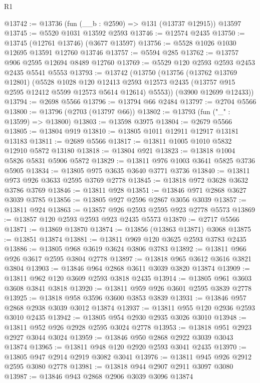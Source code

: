 \begin{lexlean}{R1}
\begin{coremodule}
@13742 := @13736 (fun (__b : @2590) => @131 (@13737 @12915)) @13597
@13745 := @5520 @1031 @13592 @2593
@13746 := @12574 @2435
@13750 := @13745 (@12761 @13746) (@3677 @13597)
@13756 := @5528 @1026 @1030 @12695 @13591 @12760 @13746
@13757 := @5594 @285
@13762 := @13757 @906 @2595 @12694 @8489 @12760
@13769 := @5529 @120 @2593 @2593 @2453 @2435 @5541 @5553
@13793 := @13742
    (@13750
      (@13756
        (@13762 @13769 @12801)
        (@5528
          @1028
          @120
          @12413
          @2593
          @12573
          @2435
          (@13757 @915 @2595 @12412 @5599 @12573 @5614 @12614)
          @5553))
      (@3900 @12699 @12433))
@13794 := @2698 @5566
@13796 := @13794 @66 @2484
@13797 := @2704 @5566
@13800 := @13796 (@2703 (@13797 @66))
@13802 := @13793 (fun ("_" : @13599) => @13800)
@13803 := @13598 @3975
@13804 := @2679 @5566
@13805 := @13804 @919
@13810 := @13805 @1011 @12911 @12917 @13181 @13183
@13811 := @2689 @5566
@13817 := @13811 @1005 @1010 @5832 @12910 @5872 @13180
@13818 := @13804 @921
@13823 := @13818 @1004 @5826 @5831 @5906 @5872
@13829 := @13811 @976 @1003 @3641 @5825 @3736 @5905
@13834 := @13805 @975 @3635 @3640 @3771 @3736
@13840 := @13811 @973 @926 @3633 @2595 @3769 @2778
@13845 := @13818 @972 @3628 @3632 @3786 @3769
@13846 := @13811 @928
@13851 := @13846 @971 @2868 @3627 @3039 @3785
@13856 := @13805 @927 @2596 @2867 @3056 @3039
@13857 := @13811 @924
@13863 := @13857 @926 @2593 @2595 @923 @2778 @5573
@13869 := @13857 @120 @2593 @2593 @923 @2435 @5573
@13870 := @2717 @5566
@13871 := @13869 @13870
@13874 := @13856 (@13863 @13871) @3068
@13875 := @13851 @13874
@13881 := @13811 @969 @120 @3625 @2593 @3783 @2435
@13886 := @13805 @968 @3619 @3624 @3806 @3783
@13892 := @13811 @966 @926 @3617 @2595 @3804 @2778
@13897 := @13818 @965 @3612 @3616 @3821 @3804
@13903 := @13846 @964 @2868 @3611 @3039 @3820 @13874
@13909 := @13811 @962 @120 @3609 @2593 @3818 @2435
@13914 := @13805 @961 @3603 @3608 @3841 @3818
@13920 := @13811 @959 @926 @3601 @2595 @3839 @2778
@13925 := @13818 @958 @3596 @3600 @3853 @3839
@13931 := @13846 @957 @2868 @2938 @3039 @3012 @13874
@13937 := @13811 @955 @120 @2936 @2593 @3010 @2435
@13942 := @13805 @954 @2930 @2935 @3026 @3010
@13948 := @13811 @952 @926 @2928 @2595 @3024 @2778
@13953 := @13818 @951 @2923 @2927 @3044 @3024
@13959 := @13846 @950 @2868 @2922 @3039 @3043 @13874
@13965 := @13811 @948 @120 @2920 @2593 @3041 @2435
@13970 := @13805 @947 @2914 @2919 @3082 @3041
@13976 := @13811 @945 @926 @2912 @2595 @3080 @2778
@13981 := @13818 @944 @2907 @2911 @3097 @3080
@13987 := @13846 @943 @2868 @2906 @3039 @3096 @13874

\end{coremodule}
\end{lexlean}

